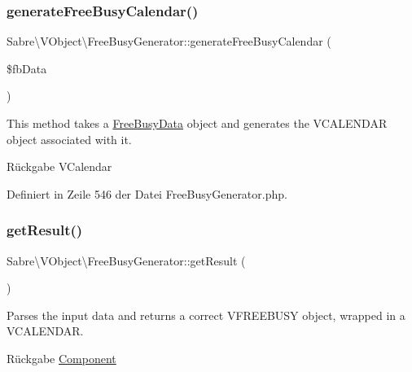 \subsubsection{\texorpdfstring{generate\+Free\+Busy\+Calendar()}{generateFreeBusyCalendar()}}
{\footnotesize\ttfamily Sabre\textbackslash{}\+V\+Object\textbackslash{}\+Free\+Busy\+Generator\+::generate\+Free\+Busy\+Calendar (\begin{DoxyParamCaption}\item[{\mbox{\hyperlink{class_sabre_1_1_v_object_1_1_free_busy_data}{Free\+Busy\+Data}}}]{\$fb\+Data }\end{DoxyParamCaption})\hspace{0.3cm}{\ttfamily [protected]}}

This method takes a \mbox{\hyperlink{class_sabre_1_1_v_object_1_1_free_busy_data}{Free\+Busy\+Data}} object and generates the V\+C\+A\+L\+E\+N\+D\+AR object associated with it.

\begin{DoxyReturn}{Rückgabe}
V\+Calendar 
\end{DoxyReturn}


Definiert in Zeile 546 der Datei Free\+Busy\+Generator.\+php.

\mbox{\label{class_sabre_1_1_v_object_1_1_free_busy_generator_afd8379ece4d169f0960a785d2a165d5b}} 
\subsubsection{\texorpdfstring{get\+Result()}{getResult()}}
{\footnotesize\ttfamily Sabre\textbackslash{}\+V\+Object\textbackslash{}\+Free\+Busy\+Generator\+::get\+Result (\begin{DoxyParamCaption}{ }\end{DoxyParamCaption})}

Parses the input data and returns a correct V\+F\+R\+E\+E\+B\+U\+SY object, wrapped in a V\+C\+A\+L\+E\+N\+D\+AR.

\begin{DoxyReturn}{Rückgabe}
\mbox{\hyperlink{class_sabre_1_1_v_object_1_1_component}{Component}} 
\end{DoxyReturn}


